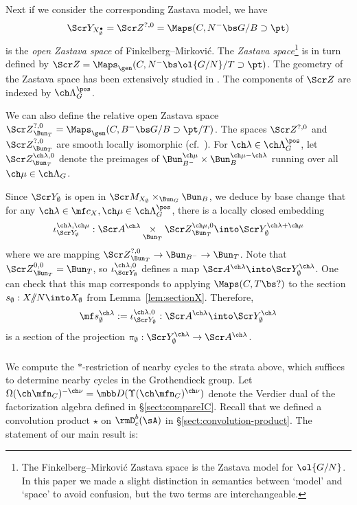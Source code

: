 \documentclass[final]{amsart}
\theoremstyle{remark}
\theoremstyle{definition}
\numberwithin{equation}{section}
\begin{document}
\medskip

Next if we consider the corresponding Zastava model, we have 
\[ \Scr Y_{X^\bullet_\emptyset} = \Scr Z^{?,0}  = \Maps(C, N^- \bs G / B \supset \pt) \]
is the \emph{open Zastava space} of Finkelberg--Mirkovi\'c. 
The \emph{Zastava space}\footnote{The Finkelberg--Mirkovi\'c Zastava space 
is the Zastava model for $\ol{G/N}$. In this paper we made a slight distinction in 
semantics between `model' and `space' to avoid confusion, but the two terms are 
interchangeable.} is in turn defined by 
$\Scr Z = \Maps_\gen(C, N^- \bs \ol{G/N} / T \supset \pt)$.
The geometry of the Zastava space has been extensively studied
in \cite{FM, FFKM, BFGM}. 
The components of $\Scr Z$ are indexed by $\ch\Lambda^\pos_G$. 

We can also define the relative open Zastava space 
${\Scr Z}^{?,0}_{\Bun_T} = \Maps_\gen(C, B^- \bs G/ B \supset \pt/T)$. 
The spaces $\Scr Z^{?,0}$ and $\Scr Z^{?,0}_{\Bun_T}$ are smooth locally isomorphic (cf.~\cite[\S 3.1]{BFGM}). 
For $\ch\lambda \in \ch\Lambda^\pos_G$, let $\Scr Z_{\Bun_T}^{\ch\lambda,0}$ denote
the preimages of $\Bun_{B^-}^{\ch\mu} \times \Bun_B^{\ch\mu-\ch\lambda}$ 
running over all $\ch\mu\in \ch\Lambda_G$. 

Since $\Scr Y_\emptyset$ is open in $\Scr M_{X_\emptyset}\times_{\Bun_G} \Bun_B$, we deduce by base change that for any $\ch\lambda\in \mf c_X, \ch\mu\in \ch\Lambda^\pos_G$, 
there is a locally closed embedding
\[ \iota_{\Scr Y_\emptyset}^{\ch\lambda,\ch\mu} : \Scr A^{\ch\lambda}\underset{\Bun_T}\times {\Scr Z}_{\Bun_T}^{\ch\mu,0} \into \Scr Y_\emptyset^{\ch\lambda+\ch\mu} \]
where we are mapping ${\Scr Z}^{?,0}_{\Bun_T} \to \Bun_{B^-} \to \Bun_T$. 
Note that ${\Scr Z}^{0,0}_{\Bun_T} = \Bun_T$, so  
$\iota^{\ch\lambda,0}_{\Scr Y_\emptyset}$ defines a map 
$\Scr A^{\ch\lambda} \into \Scr Y^{\ch\lambda}_\emptyset$. 
One can check that this map corresponds to applying $\Maps(C,T\bs ?)$ to 
the section $s_\emptyset : X/\!\!/N \into X_\emptyset$
from Lemma~\ref{lem:sectionX}. 
Therefore, 
\[ \mf s_\emptyset^{\ch\lambda} := \iota^{\ch\lambda,0}_{\Scr Y_\emptyset} : \Scr A^{\ch\lambda} \into \Scr Y^{\ch\lambda}_{\emptyset} \]
is a section of the projection $\pi_\emptyset : \Scr Y^{\ch\lambda}_\emptyset \to \Scr A^{\ch\lambda}$. 


\subsubsection{}
We compute the $*$-restriction of nearby cycles to the strata above, which
suffices to determine nearby cycles in the Grothendieck group. 
Let $\Omega(\ch\mfn_C)^{-\ch\nu} = \mbb D (\Upsilon(\ch\mfn_C)^{\ch\nu})$ 
denote the Verdier dual of the factorization algebra defined in \S\ref{sect:compareIC}. 
Recall that we defined a convolution product $\star$ on $\rmD^b_c(\sA)$ in \S\ref{sect:convolution-product}. 
The statement of our main result is: 
\end{document}
